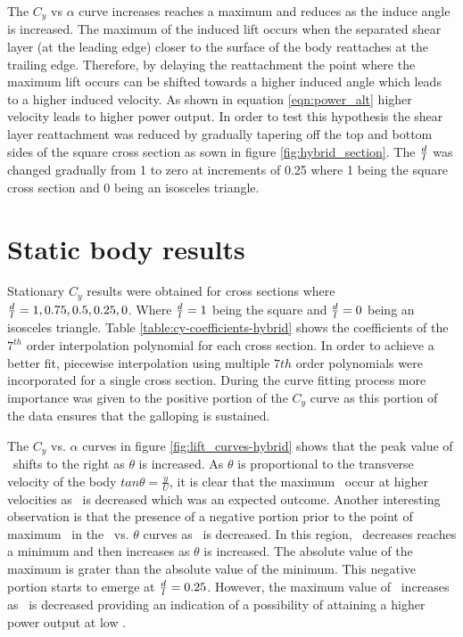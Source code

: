 The $C_y$ vs $\alpha$ curve increases reaches a maximum and reduces as the induce angle is increased. The maximum of the induced lift occurs when the separated  shear layer (at the leading edge) closer to the surface of the body reattaches at the trailing edge. Therefore, by delaying the reattachment the point where the maximum lift occurs can be shifted towards a higher induced angle which leads to a higher induced velocity. As shown in equation \ref{eqn:power_alt} higher velocity leads to higher power output. In order to test this hypothesis the shear layer reattachment was reduced by gradually tapering off the top and bottom sides of the square cross section as sown in figure \ref{fig:hybrid_section}. The $\frac{d}{l}$ was changed gradually from 1 to zero at increments of 0.25 where 1 being the square cross section and 0 being an isosceles triangle.    



\section{Static body results}
 \label{sec:cross-sec-Static body results}


Stationary $C_y$ results were obtained for cross sections where $\frac{d}{l}=1,0.75,0.5,0.25,0$. Where $\frac{d}{l}=1$ being the square and $\frac{d}{l}=0$ being an isosceles  triangle. Table \ref{table:cy-coefficients-hybrid} shows the coefficients of the $7^{th}$ order interpolation polynomial for each cross section. In order to achieve a better fit, piecewise interpolation using multiple $7th$ order polynomials were incorporated for a single cross section. During the curve fitting process more importance was given to the positive portion of the $C_{y}$ curve as this portion of the data ensures that the galloping is sustained. 



The $C_y$ vs. $\alpha$ curves in figure \ref{fig:lift_curves-hybrid} shows that the peak value of \cy\ shifts to the right as $\theta$ is increased. As $\theta$ is proportional to the transverse velocity of the body $tan{\theta}=\frac{\dot{y}}{U}$, it is clear that the maximum \cy\ occur at higher velocities as \ratio\ is decreased which was an expected outcome. Another interesting observation is that the presence of a negative portion prior to the point of maximum \cy\ in the \cy\ vs. $\theta$ curves as \ratio\ is decreased. In this region, \cy\ decreases reaches a minimum and then increases as $\theta$ is increased. The absolute value of the maximum is grater than the absolute value of the minimum. This negative portion starts to emerge at $\frac{d}{l}=0.25$. However, the maximum value of \cy\ increases as \ratio\ is decreased providing an indication of a possibility of attaining a higher power output at low \ratio.


